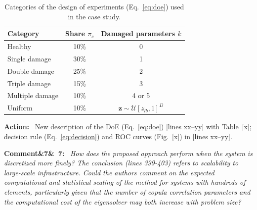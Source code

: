 \documentclass[11pt]{article}
\newenvironment{rcomment}[1]{\par\bigskip\noindent\textbf{Comment\ifx&#1&\else\ #1\fi:}\ \itshape}{\par}
\newenvironment{action}{\par\smallskip\noindent\color{resp}\textbf{Action:}\ }{\par}
\newcommand{\tbd}[1]{\textcolor{note}{\textsf{[#1]}}}
\newcommand{\lines}[1]{\tbd{lines #1}}
\newcommand{\z}{\mathbf{z}}
\begin{document}
\begin{table}[H]
\centering\small
\caption{Categories of the design of experiments (Eq.~\eqref{eq:doe}) used in the case study.}
\label{tab:doe}
\begin{tabular}{lcc}
\toprule
Category & Share $\pi_c$ & Damaged parameters $k$ \\
\midrule
Healthy & 10\% & 0 \\
Single damage & 30\% & 1 \\
Double damage & 25\% & 2 \\
Triple damage & 15\% & 3 \\
Multiple damage & 10\% & 4 or 5 \\
Uniform & 10\% & $\z\sim\mathcal{U}[z_{lb},1]^D$ \\
\bottomrule
\end{tabular}
\end{table}

\begin{action}
New description of the DoE (Eq.~\eqref{eq:doe}) \lines{xx--yy} with Table~\tbd{x}; decision rule (Eq.~\eqref{eq:decision}) and ROC curves (Fig.~\tbd{x}) in
\lines{xx--yy}.
\end{action}

\begin{rcomment}{7}
How does the proposed approach perform when the system is discretized more finely? The conclusion (lines 399-403)
refers to scalability to large-scale infrastructure. Could the authors comment on the expected computational and
statistical scaling of the method for systems with hundreds of elements, particularly given that the number of copula
correlation parameters and the computational cost of the eigensolver may both increase with problem size?
\end{rcomment}
\end{document}
